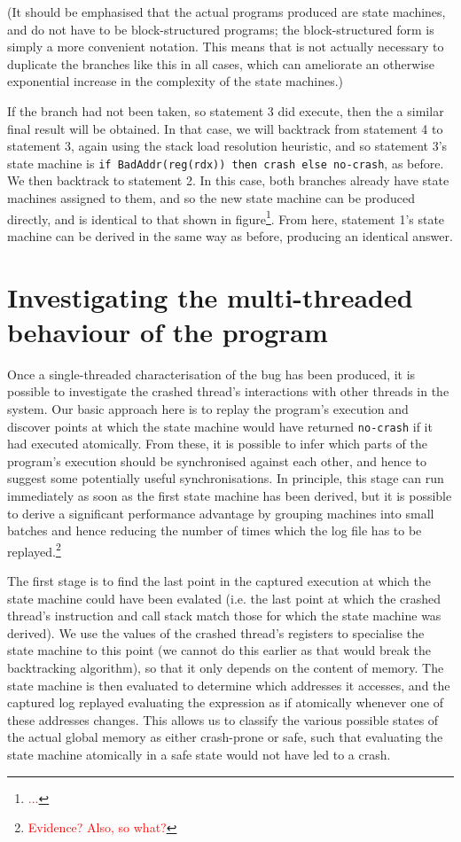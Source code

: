 \documentclass[10pt,twocolumn,preprint,natbib,authoryear]{sigplanconf}
\newcommand{\editorial}[1]{\textcolor{red}{\footnote{\textcolor{red}{#1}}}}
\begin{document}
(It should be emphasised that the actual programs produced are state
machines, and do not have to be block-structured programs; the
block-structured form is simply a more convenient notation.  This
means that is not actually necessary to duplicate the branches like
this in all cases, which can ameliorate an otherwise exponential
increase in the complexity of the state machines.)

If the branch had not been taken, so statement 3 did execute, then the
a similar final result will be obtained.  In that case, we will
backtrack from statement 4 to statement 3, again using the stack load
resolution heuristic, and so statement 3's state machine is
\verb|if BadAddr(reg(rdx)) then crash else no-crash|, as before.  We
then backtrack to statement 2.  In this case, both branches already
have state machines assigned to them, and so the new state machine can
be produced directly, and is identical to that shown in
figure\editorial{...}.  From here, statement 1's state machine can be
derived in the same way as before, producing an identical answer.

\section{Investigating the multi-threaded behaviour of the program}

Once a single-threaded characterisation of the bug has been produced,
it is possible to investigate the crashed thread's interactions with
other threads in the system.  Our basic approach here is to replay the
program's execution and discover points at which the state machine
would have returned \verb|no-crash| if it had executed atomically.
From these, it is possible to infer which parts of the program's
execution should be synchronised against each other, and hence to
suggest some potentially useful synchronisations.  In principle, this
stage can run immediately as soon as the first state machine has been
derived, but it is possible to derive a significant performance
advantage by grouping machines into small batches and hence reducing
the number of times which the log file has to be
replayed.\editorial{Evidence?  Also, so what?}

The first stage is to find the last point in the captured execution at
which the state machine could have been evalated (i.e. the last point
at which the crashed thread's instruction and call stack match those
for which the state machine was derived).  We use the values of the
crashed thread's registers to specialise the state machine to this
point (we cannot do this earlier as that would break the backtracking
algorithm), so that it only depends on the content of memory.  The
state machine is then evaluated to determine which addresses it
accesses, and the captured log replayed evaluating the expression as
if atomically whenever one of these addresses changes.  This allows us
to classify the various possible states of the actual global memory as
either crash-prone or safe, such that evaluating the state machine
atomically in a safe state would not have led to a crash.
\end{document}
